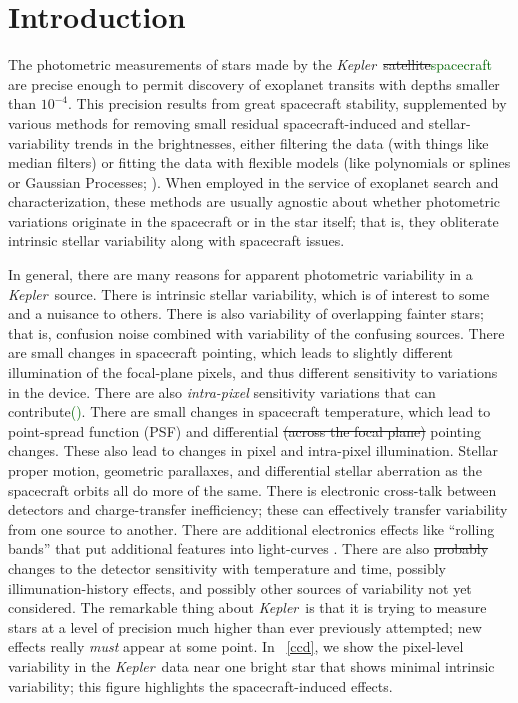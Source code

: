 \documentclass[12pt, preprint]{aastex}
\newcommand{\project}[1]{\textsl{#1}}
\newcommand{\Kepler}{\project{Kepler}}
\newcommand{\revise}[1]{\textcolor{darkgreen}{#1}}
\newcommand{\remove}[1]{\sout{#1}}
\begin{document}
\section{Introduction}

The photometric measurements of stars made by the \Kepler\ \remove{satellite}\revise{spacecraft} are precise enough
  to permit discovery of exoplanet transits with depths smaller than $10^{-4}$.
This precision results from great spacecraft stability,
  supplemented by various methods for removing small residual spacecraft-induced and stellar-variability trends in the brightnesses,
  either filtering the data (with things like median filters)
  or fitting the data with flexible models (like polynomials or splines or Gaussian Processes; 
  \citealt{gaussian}).
When employed in the service of exoplanet search and characterization,
  these methods are usually agnostic about whether photometric variations originate in the spacecraft or in the star itself;
  that is, they obliterate intrinsic stellar variability along with spacecraft issues.

In general, there are many reasons for apparent photometric variability in a \Kepler\ source.
There is intrinsic stellar variability,
  which is of interest to some and a nuisance to others.
There is also variability of overlapping fainter stars;
  that is, confusion noise combined with variability of the confusing sources.
There are small changes in spacecraft pointing,
  which leads to slightly different illumination of the focal-plane pixels,
  and thus different sensitivity to variations in the device.
There are also \emph{intra-pixel} sensitivity variations that can contribute\revise{(\citealt{subpixel})}.
There are small changes in spacecraft temperature,
  which lead to point-spread function (PSF) and differential \remove{(across the focal plane)} pointing changes.
These also lead to changes in pixel and intra-pixel illumination.
Stellar proper motion, geometric parallaxes, and differential stellar aberration as the spacecraft orbits all do more of the same.
There is electronic cross-talk between detectors and charge-transfer inefficiency;
  these can effectively transfer variability from one source to another.
There are additional electronics effects like ``rolling bands'' that put additional features into light-curves \revise{\citep{handbook}}.
There are also \remove{probably} changes to the detector sensitivity with temperature and time,
  possibly illimunation-history effects,
  and possibly other sources of variability not yet considered.
The remarkable thing about \Kepler\ is that it is trying to measure stars at a level of precision
  much higher than ever previously attempted;
  new effects really \emph{must} appear at some point.
In \figurename~\ref{ccd}, we show the pixel-level variability in the \Kepler\ data
  near one bright star that shows minimal intrinsic variability;
  this figure highlights the spacecraft-induced effects.
\end{document}
